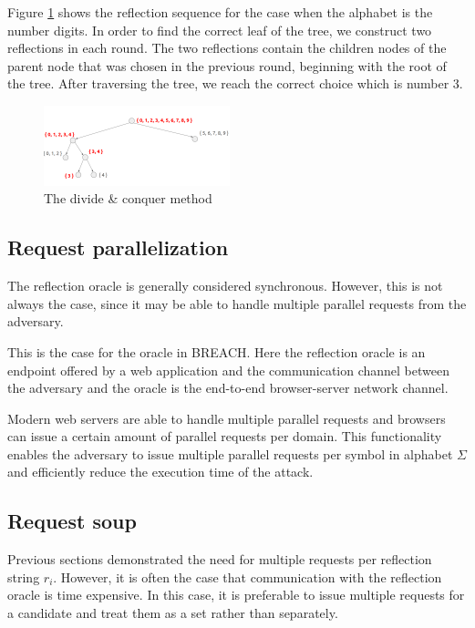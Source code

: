 \documentclass[conference, letterpaper, 10pt]{IEEEtran}
\begin{document}
Figure \ref{fig:divide_and_conquer} shows the reflection sequence for the case
when the alphabet is the number digits. In order to find the correct leaf of the
tree, we construct two reflections in each round. The two reflections contain
the children nodes of the parent node that was chosen in the previous round,
beginning with the root of the tree. After traversing the tree, we reach the
correct choice which is number 3.

   \begin{figure}[thpb]
      \centering
          \includegraphics[width=0.48\textwidth]{divide_and_conquer.png}
      \caption{The divide \& conquer method}
      \label{fig:divide_and_conquer}
   \end{figure}

\subsection{Request parallelization}\label{subsec:parallel}
The reflection oracle is generally considered synchronous. However, this is not
always the case, since it may be able to handle multiple parallel requests from
the adversary.

This is the case for the oracle in BREACH. Here the reflection oracle is an endpoint
offered by a web application and the communication channel between the adversary
and the oracle is the end-to-end browser-server network channel.

Modern web servers are able to handle multiple parallel requests and
browsers can issue a certain amount of parallel requests per domain. This
functionality enables the adversary to issue multiple parallel requests per
symbol in alphabet $\Sigma$ and efficiently reduce the execution time of
the attack.

\subsection{Request soup}
Previous sections demonstrated the need for multiple requests per reflection
string $r_i$. However, it is often the case that communication with the
reflection oracle is time
expensive. In this case, it is preferable to issue multiple
requests for a candidate and treat them as a set rather than separately.
\end{document}
